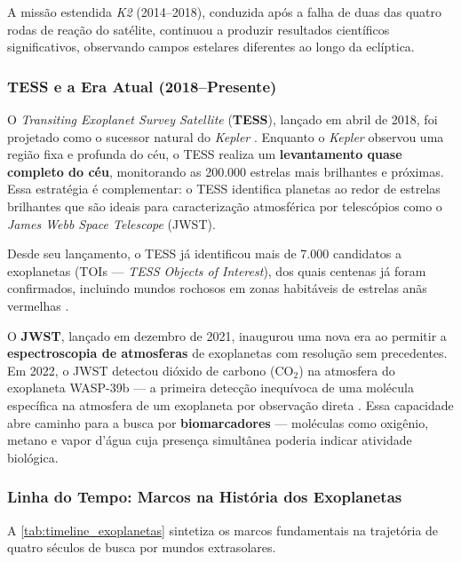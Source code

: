 \documentclass[
	12pt,
	openany,
	oneside,
	a4paper,
	english,
	brazil
]{abntex2}
\begin{document}
A missão estendida \textit{K2} (2014--2018), conduzida após a falha de duas das quatro rodas de reação do satélite, continuou a produzir resultados científicos significativos, observando campos estelares diferentes ao longo da eclíptica.

\subsubsection{TESS e a Era Atual (2018--Presente)}

O \textit{Transiting Exoplanet Survey Satellite} (\textbf{TESS}), lançado em abril de 2018, foi projetado como o sucessor natural do \textit{Kepler} \cite{ricker2015}. Enquanto o \textit{Kepler} observou uma região fixa e profunda do céu, o TESS realiza um \textbf{levantamento quase completo do céu}, monitorando as 200.000 estrelas mais brilhantes e próximas. Essa estratégia é complementar: o TESS identifica planetas ao redor de estrelas brilhantes que são ideais para caracterização atmosférica por telescópios como o \textit{James Webb Space Telescope} (JWST).

Desde seu lançamento, o TESS já identificou mais de 7.000 candidatos a exoplanetas (TOIs --- \textit{TESS Objects of Interest}), dos quais centenas já foram confirmados, incluindo mundos rochosos em zonas habitáveis de estrelas anãs vermelhas \cite{nasaexoplanet2024}.

O \textbf{JWST}, lançado em dezembro de 2021, inaugurou uma nova era ao permitir a \textbf{espectroscopia de atmosferas} de exoplanetas com resolução sem precedentes. Em 2022, o JWST detectou dióxido de carbono (CO$_2$) na atmosfera do exoplaneta WASP-39b --- a primeira detecção inequívoca de uma molécula específica na atmosfera de um exoplaneta por observação direta \cite{jwst2023}. Essa capacidade abre caminho para a busca por \textbf{biomarcadores} --- moléculas como oxigênio, metano e vapor d'água cuja presença simultânea poderia indicar atividade biológica.

\subsubsection{Linha do Tempo: Marcos na História dos Exoplanetas}

A \autoref{tab:timeline_exoplanetas} sintetiza os marcos fundamentais na trajetória de quatro séculos de busca por mundos extrasolares.
\end{document}
